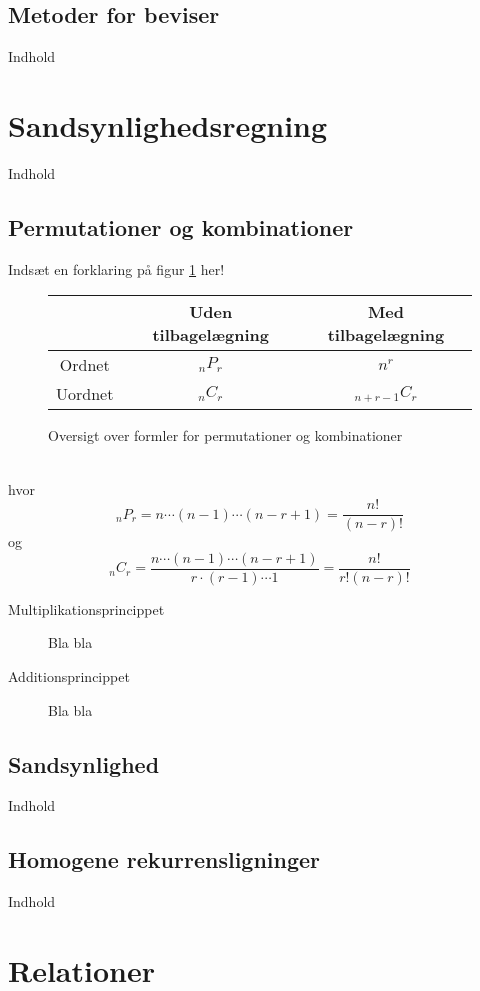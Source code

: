 \documentclass[a4paper]{article}
\begin{document}
  \subsection{Metoder for beviser}
    Indhold
\section{Sandsynlighedsregning}
  Indhold
  \subsection{Permutationer og kombinationer}
  Indsæt en forklaring på figur \ref{fig:perm} her!
  \begin{figure}[h!]
  \begin{center}
    \begin{tabular}{|c|c|c|}
    \hline
    & Uden tilbagelægning & Med tilbagelægning \\
    \hline
    Ordnet  & $_nP_r$ & $n^r$ \\
    \hline
    Uordnet & $_nC_r$ & $_{n+r-1}C_r$ \\
    \hline
    \end{tabular}
    \caption{Oversigt over formler for permutationer og kombinationer} \label{fig:perm}
    \end{center}
  \end{figure}\\
  hvor
  \begin{equation}
    _nP_r=n\cdots{}(n-1)\cdots{}(n-r+1) = \frac{n!}{(n-r)!}
  \end{equation}
  og
  \begin{equation}
    _nC_r=\frac{n\cdots (n-1) \cdots (n-r+1)}{r\cdot (r-1)\cdots 1} = \frac{n!}{r!(n-r)!}
  \end{equation}
  \begin{description}
  \item[Multiplikationsprincippet] Bla bla
  \item[Additionsprincippet] Bla bla
  \end{description}
  \subsection{Sandsynlighed}
    Indhold
  \subsection{Homogene rekurrensligninger}
    Indhold

\section{Relationer}
\end{document}
